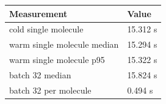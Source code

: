\begin{tabular}{ll}
\toprule
Measurement & Value \\
\midrule
cold single molecule & 15.312 s \\
warm single molecule median & 15.294 s \\
warm single molecule p95 & 15.322 s \\
batch 32 median & 15.824 s \\
batch 32 per molecule & 0.494 s \\
\bottomrule
\end{tabular}
